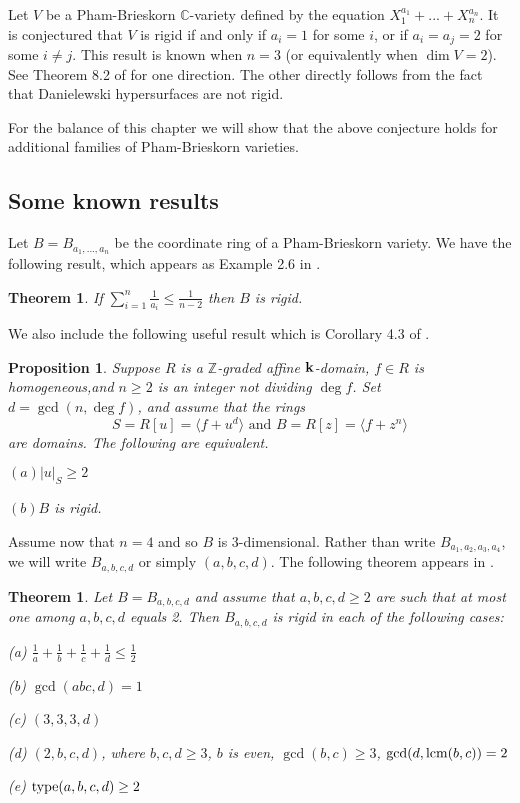 \documentclass[12pt]{amsart}
\theoremstyle{plain}
\newtheorem{theorem}[subsection]{Theorem}
\newtheorem{proposition}[subsection]{Proposition}
\theoremstyle{definition}
\newcommand{\lcm}{		\operatorname{{\rm lcm}}}
\newcommand{\type}{		\operatorname{{\rm type}}}
\newcommand{\lb}{\langle}
\newcommand{\rb}{\rangle}
\newcommand{\Integ}{\ensuremath{\mathbb{Z}}}
\newcommand{\Comp}{\ensuremath{\mathbb{C}}}
\newcommand{\bk}{{\ensuremath{\rm \bf k}}}
\begin{document}
Let $V$ be a Pham-Brieskorn $\Comp$-variety defined by the equation $X_1^{a_1} + ... + X_n^{a_n}$. It is conjectured that $V$ is rigid if and only if $a_i = 1$ for some $i$, or if $a_i = a_j = 2$ for some $i \neq j$. This result is known when $n = 3$ (or equivalently when $\dim V = 2$). See Theorem 8.2 of \cite{freudenburg2013} for one direction. The other directly follows from the fact that Danielewski hypersurfaces are not rigid.   

For the balance of this chapter we will show that the above conjecture holds for additional families of Pham-Brieskorn varieties.

\subsection{Some known results}

Let $B = B_{a_1, ..., a_n}$ be the coordinate ring of a Pham-Brieskorn variety. We have the following result, which appears as Example 2.6 in \cite{almostRigidRings}. 

\begin{theorem}\label{lowSum} If $\sum\limits_{i=1}^n \frac{1}{a_i} \leq \frac{1}{n-2}$ then $B$ is rigid. 
\end{theorem} 

We also include the following useful result which is Corollary 4.3 of \cite{freudenburg2013}.

\begin{proposition} \label{rigidDegree2}
	Suppose $R$ is a $\Integ$-graded affine $\bk$-domain, $f \in R$ is homogeneous,and $n \geq 2$ is an integer not dividing $\deg f$. Set $d = \gcd(n, \deg f)$, and assume that the rings
	$$ S = R[u]= \lb f + u^d \rb \text{ and } B = R[z]= \lb f + z^n \rb$$
	are domains. The following are equivalent.
	
	$(a) |u|_S \geq 2$
	
	$(b) B$ is rigid. 
\end{proposition}

Assume now that $n=4$ and so $B$ is 3-dimensional. Rather than write $B_{a_1,a_2,a_3,a_4}$, we will write $B_{a,b,c,d}$ or simply $(a,b,c,d)$. The following theorem appears in \cite{LNDsAbelianGroup}.    

\begin{theorem} \label{collection}
	Let $B = B_{a,b,c,d}$ and assume that $a,b,c,d \geq 2$ are such that at most one among $a,b,c,d$ equals 2. Then $B_{a,b,c,d}$ is rigid in each of the following cases:
	
	(a)  $\frac{1}{a} + \frac{1}{b} + \frac{1}{c} + \frac{1}{d} \leq \frac{1}{2}$
	
	(b) $\gcd(abc,d) = 1$
	
	(c) $(3,3,3,d)$
	
	(d) $(2,b,c,d)$, where $b,c,d \geq 3$, $b$ is even, $\gcd(b,c) \geq 3$, $\gcd(d,\lcm(b,c)) = 2$
	
	(e) $\type(a,b,c,d) \geq 2$
\end{theorem}
\end{document}
